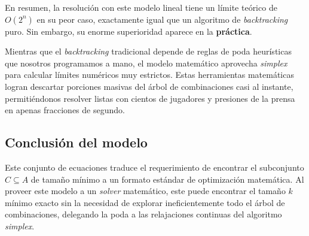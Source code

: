 En resumen, la resolución con este modelo lineal tiene un límite teórico de $O(2^n)$ en su peor caso, exactamente igual que un algoritmo de \textit{backtracking} puro. Sin embargo, su enorme superioridad aparece en la \textbf{práctica}. 

Mientras que el \textit{backtracking} tradicional depende de reglas de poda heurísticas que nosotros programamos a mano, el modelo matemático aprovecha \textit{simplex} para calcular límites numéricos muy estrictos. Estas herramientas matemáticas logran descartar porciones masivas del árbol de combinaciones casi al instante, permitiéndonos resolver listas con cientos de jugadores y presiones de la prensa en apenas fracciones de segundo.

\subsection*{Conclusión del modelo}
Este conjunto de ecuaciones traduce el requerimiento de encontrar el subconjunto $C \subseteq A$ de tamaño mínimo a un formato estándar de optimización matemática. Al proveer este modelo a un \textit{solver} matemático, este puede encontrar el tamaño $k$ mínimo exacto sin la necesidad de explorar ineficientemente todo el árbol de combinaciones, delegando la poda a las relajaciones continuas del algoritmo \textit{simplex}.


